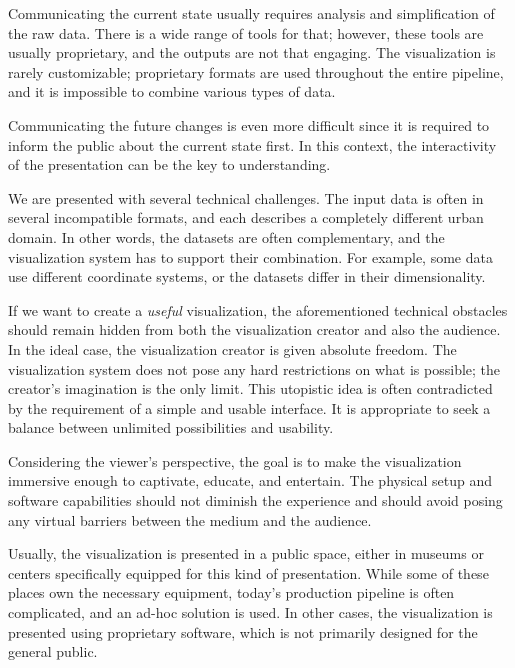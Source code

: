 Communicating the current state usually requires analysis and simplification of the raw data. There is a wide range of tools for that; however, these tools are usually proprietary, and the outputs are not that engaging. The visualization is rarely customizable; proprietary formats are used throughout the entire pipeline, and it is impossible to combine various types of data.

Communicating the future changes is even more difficult since it is required to inform the public about the current state first. In this context, the interactivity of the presentation can be the key to understanding.

We are presented with several technical challenges. The input data is often in several incompatible formats, and each describes a completely different urban domain. In other words, the datasets are often complementary, and the visualization system has to support their combination. For example, some data use different coordinate systems, or the datasets differ in their dimensionality.

If we want to create a \textit{useful} visualization, the aforementioned technical obstacles should remain hidden from both the visualization creator and also the audience. In the ideal case, the visualization creator is given absolute freedom. The visualization system does not pose any hard restrictions on what is possible; the creator's imagination is the only limit. This utopistic idea is often contradicted by the requirement of a simple and usable interface. It is appropriate to seek a balance between unlimited possibilities and usability.

Considering the viewer's perspective, the goal is to make the visualization immersive enough to captivate, educate, and entertain. The physical setup and software capabilities should not diminish the experience and should avoid posing any virtual barriers between the medium and the audience.

Usually, the visualization is presented in a public space, either in museums or centers specifically equipped for this kind of presentation. While some of these places own the necessary equipment, today's production pipeline is often complicated, and an ad-hoc solution is used. In other cases, the visualization is presented using proprietary software, which is not primarily designed for the general public.

